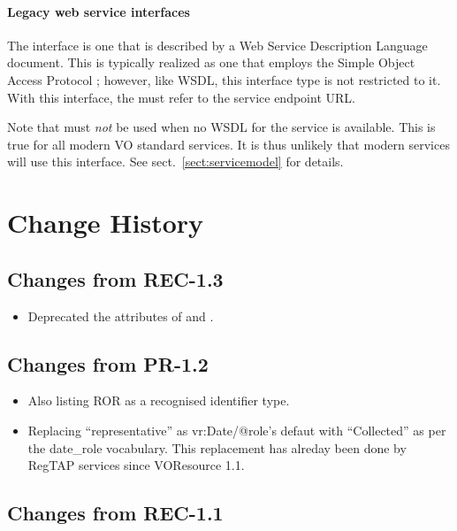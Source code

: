 \documentclass[11pt,a4paper]{ivoa}
\begin{document}

\paragraph{Legacy web service interfaces}

The  interface is one that is described by a Web
Service Description Language \citep{booth07} document. This is typically
realized as one that employs the Simple Object Access Protocol
\citep{std:SOAP}; however, like WSDL, this interface type is not
restricted to it. With this interface, the  must
refer to the service endpoint URL.

Note that  must \emph{not} be used when no WSDL for
the service is available.  This is true for all modern VO standard
services.  It is thus unlikely that modern services will use this
interface.  See sect.~\ref{sect:servicemodel} for details.

\appendix

\section{Change History}

\subsection{Changes from REC-1.3}

\begin{itemize}
\item Deprecated the  attributes of 
and .
\end{itemize}


\subsection{Changes from PR-1.2}

\begin{itemize}
\item Also listing ROR as a recognised identifier type.
\item Replacing ``representative'' as vr:Date/@role's defaut with
``Collected'' as per the date\_role vocabulary.  This replacement has
alreday been done by RegTAP services since VOResource 1.1.
\end{itemize}

\subsection{Changes from REC-1.1}
\end{document}
